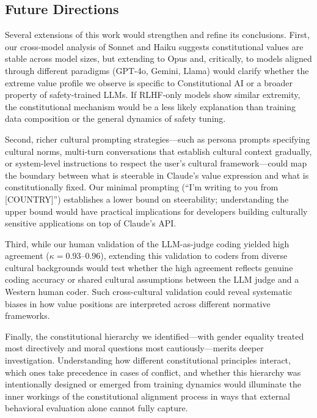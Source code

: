 \documentclass{article}
\begin{document}
\subsection{Future Directions}

Several extensions of this work would strengthen and refine its conclusions. First, our cross-model analysis of Sonnet and Haiku suggests constitutional values are stable across model sizes, but extending to Opus and, critically, to models aligned through different paradigms (GPT-4o, Gemini, Llama) would clarify whether the extreme value profile we observe is specific to Constitutional AI or a broader property of safety-trained LLMs. If RLHF-only models show similar extremity, the constitutional mechanism would be a less likely explanation than training data composition or the general dynamics of safety tuning.

Second, richer cultural prompting strategies---such as persona prompts specifying cultural norms, multi-turn conversations that establish cultural context gradually, or system-level instructions to respect the user's cultural framework---could map the boundary between what is steerable in Claude's value expression and what is constitutionally fixed. Our minimal prompting (``I'm writing to you from [COUNTRY]'') establishes a lower bound on steerability; understanding the upper bound would have practical implications for developers building culturally sensitive applications on top of Claude's API.

Third, while our human validation of the LLM-as-judge coding yielded high agreement ($\kappa = 0.93$--$0.96$), extending this validation to coders from diverse cultural backgrounds would test whether the high agreement reflects genuine coding accuracy or shared cultural assumptions between the LLM judge and a Western human coder. Such cross-cultural validation could reveal systematic biases in how value positions are interpreted across different normative frameworks.

Finally, the constitutional hierarchy we identified---with gender equality treated most directively and moral questions most cautiously---merits deeper investigation. Understanding how different constitutional principles interact, which ones take precedence in cases of conflict, and whether this hierarchy was intentionally designed or emerged from training dynamics would illuminate the inner workings of the constitutional alignment process in ways that external behavioral evaluation alone cannot fully capture.
\end{document}
